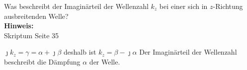 \begin{question}[section=3,name={Wellenzahl 2},difficulty=,quantity=1,type=thr,tags={}]
	Was beschreibt der Imaginärteil der Wellenzahl $k_z$ bei einer sich in $z$-Richtung ausbreitenden Welle?
	\\ \textbf{Hinweis:}\\
	Skriptum Seite 35
\end{question}
\begin{solution}
	$\jmath k_z = \gamma= \alpha + \jmath \beta$ deshalb ist $k_z = \beta -\jmath \alpha$
	Der Imaginärteil der Wellenzahl beschreibt die Dämpfung $\alpha$ der Welle.
\end{solution}